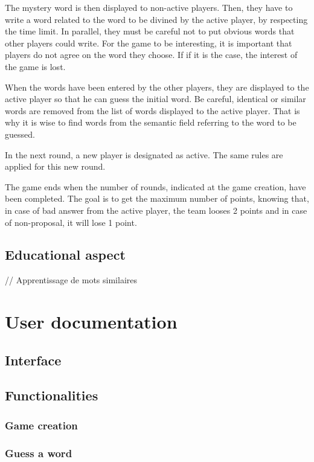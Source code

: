 \documentclass{tnreport}
\begin{document}
The mystery word is then displayed to non-active players. Then, they have to write a word related to the word to be divined by the active player, by respecting the time limit. In parallel, they must be careful not to put obvious words that other players could write. For the game to be interesting, it is important that players do not agree on the word they choose. If if it is the case, the interest of the game is lost. 

When the words have been entered by the other players, they are displayed to the active player so that he can guess the initial word. Be careful, identical or similar words are removed from the list of words displayed to the active player. That is why it is wise to find words from the semantic field referring to the word to be guessed. 

In the next round, a new player is designated as active. The same rules are applied for this new round. 

The game ends when the number of rounds, indicated at the game creation, have been completed. The goal is to get the maximum number of points, knowing that, in case of bad answer from the active player, the team looses 2 points and in case of non-proposal, it will lose 1 point. 

\section{Educational aspect}

// Apprentissage de mots similaires

\chapter{User documentation}

\section{Interface}

\section{Functionalities}

\subsection{Game creation}

\subsection{Guess a word}
\end{document}
